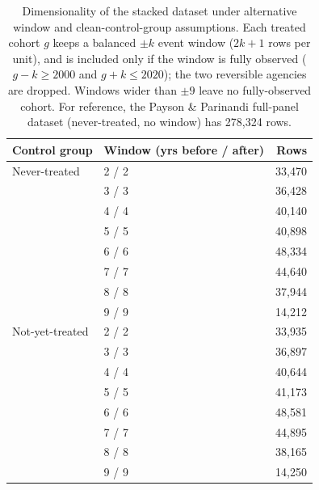 \begin{table}[t]
\centering
\caption{Dimensionality of the stacked dataset under alternative window and
clean-control-group assumptions. Each treated cohort $g$ keeps a balanced
$\pm k$ event window ($2k+1$ rows per unit), and is included only if the
window is fully observed ($g-k \ge 2000$ and $g+k \le 2020$); the two
reversible agencies are dropped. Windows wider than $\pm 9$ leave no
fully-observed cohort. For reference, the Payson \& Parinandi full-panel
dataset (never-treated, no window) has 278{,}324 rows.}
\label{tab:stacked-dim}
\begin{tabular}{llr}
\toprule
Control group & Window (yrs before / after) & Rows \\
\midrule
Never-treated & 2 / 2 & 33,470 \\
 & 3 / 3 & 36,428 \\
 & 4 / 4 & 40,140 \\
 & 5 / 5 & 40,898 \\
 & 6 / 6 & 48,334 \\
 & 7 / 7 & 44,640 \\
 & 8 / 8 & 37,944 \\
 & 9 / 9 & 14,212 \\
\midrule
Not-yet-treated & 2 / 2 & 33,935 \\
 & 3 / 3 & 36,897 \\
 & 4 / 4 & 40,644 \\
 & 5 / 5 & 41,173 \\
 & 6 / 6 & 48,581 \\
 & 7 / 7 & 44,895 \\
 & 8 / 8 & 38,165 \\
 & 9 / 9 & 14,250 \\
\bottomrule
\end{tabular}
\end{table}
